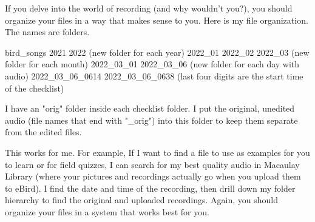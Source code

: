 \documentclass[12pt]{article}
\begin{document}
If you delve into the world of recording (and why wouldn't you?), you should organize your files in a way that makes sense to you.  Here is my file organization. The names are folders.

bird\_songs\newline
\hspace*{1em}2021\newline
\hspace*{1em}2022 (new folder for each year)\newline
\hspace*{2em}2022\_01\newline
\hspace*{2em}2022\_02\newline
\hspace*{2em}2022\_03 (new folder for each month)\newline
\hspace*{3em}2022\_03\_01\newline
\hspace*{3em}2022\_03\_06 (new folder for each day with audio)\newline
\hspace*{4em}2022\_03\_06\_0614\newline
\hspace*{4em}2022\_03\_06\_0638 (last four digits are the start time of the checklist)
        
I have an "orig" folder inside each checklist folder. I put the original, unedited audio (file names that end with "\_orig") into this folder to keep them separate from the edited files.

This works for me. For example, If I want to find a file to use as examples for you to learn or for field quizzes, I can search for my best quality audio in Macaulay Library (where your pictures and recordings actually go when you upload them to eBird). I find the date and time of the recording, then drill down my folder hierarchy to find the original and uploaded recordings. Again, you should organize your files in a system that works best for you.
\end{document}
